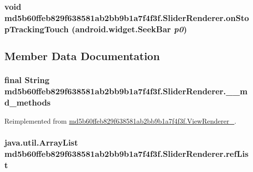 \hypertarget{classmd5b60ffeb829f638581ab2bb9b1a7f4f3f_1_1_slider_renderer_7311d722d790861ea5026d332a612245}{
\subsubsection[{onStopTrackingTouch}]{\setlength{\rightskip}{0pt plus 5cm}void md5b60ffeb829f638581ab2bb9b1a7f4f3f.SliderRenderer.onStopTrackingTouch (android.widget.SeekBar {\em p0})}}
\label{classmd5b60ffeb829f638581ab2bb9b1a7f4f3f_1_1_slider_renderer_7311d722d790861ea5026d332a612245}




\subsection{Member Data Documentation}
\hypertarget{classmd5b60ffeb829f638581ab2bb9b1a7f4f3f_1_1_slider_renderer_bd36f56a20d51aa82400faf5b2db4536}{
\subsubsection[{\_\-\_\-md\_\-methods}]{\setlength{\rightskip}{0pt plus 5cm}final String {\bf md5b60ffeb829f638581ab2bb9b1a7f4f3f.SliderRenderer.\_\-\_\-md\_\-methods}}}
\label{classmd5b60ffeb829f638581ab2bb9b1a7f4f3f_1_1_slider_renderer_bd36f56a20d51aa82400faf5b2db4536}




Reimplemented from \hyperlink{classmd5b60ffeb829f638581ab2bb9b1a7f4f3f_1_1_view_renderer__2_80b609e3e4054c380887d4dc2907a875}{md5b60ffeb829f638581ab2bb9b1a7f4f3f.ViewRenderer\_}.\hypertarget{classmd5b60ffeb829f638581ab2bb9b1a7f4f3f_1_1_slider_renderer_9a55916f662fc8ad22d378850e0c8e13}{
\subsubsection[{refList}]{\setlength{\rightskip}{0pt plus 5cm}java.util.ArrayList {\bf md5b60ffeb829f638581ab2bb9b1a7f4f3f.SliderRenderer.refList}}}
\label{classmd5b60ffeb829f638581ab2bb9b1a7f4f3f_1_1_slider_renderer_9a55916f662fc8ad22d378850e0c8e13}




